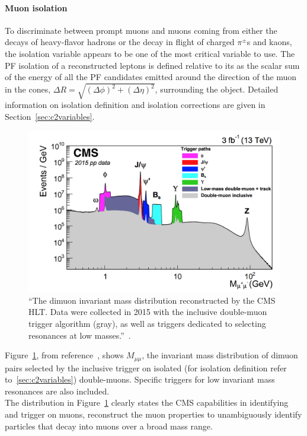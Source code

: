 \paragraph{Muon isolation}\label{sec:muoniso}
To discriminate between prompt muons and muons coming from either the decays
of heavy-flavor hadrons or the decay in flight of charged $\pi^{\pm}$s and kaons, the isolation variable appears to be one of
the most critical variable to use. The PF isolation of a reconstructed
leptons is defined relative to its \pt as the scalar
sum of the energy of all the PF candidates emitted around the
direction of the muon in the cones, $\Delta R = \sqrt{(\Delta
  \phi)^2+(\Delta \eta)^2}$, surrounding the object. Detailed
information on isolation definition and isolation corrections are
given in Section~\ref{sec:c2variables}.

 \begin{figure}[h!]
\centering
\includegraphics[clip,trim=1.2cm 0.1cm 0.5cm 0.3cm, width=.60\textwidth]{Figures/c2/dimuon}
\caption{``The dimuon invariant mass distribution reconstructed by the CMS HLT. Data were
collected in 2015 with the inclusive double-muon trigger algorithm (gray), as well as triggers
dedicated to selecting resonances at low masses.''~\cite{Sirunyan_2018_muon}.}
\label{fig:dimuon}
\end{figure}

Figure~\ref{fig:dimuon}, from reference~\cite{Sirunyan_2018_muon}, shows $M_{\mu \mu}$, the invariant mass distribution of dimuon pairs selected by
the inclusive trigger on isolated (for isolation definition refer
to~\ref{sec:c2variables}) double-muons. Specific triggers for low
invariant mass resonances are also included.\\
The distribution in Figure~\ref{fig:dimuon} clearly states
the CMS capabilities in identifying and trigger on
muons, reconstruct the muon properties to unambiguously
identify particles that decay into muons over a broad mass range.



